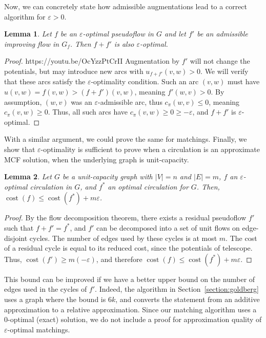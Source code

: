 \documentclass[11pt]{article}
\def\eps{\varepsilon}
\theoremstyle{plain}
\newtheorem{lemma}{Lemma}
\def\cost{\operatorname{cost}}
\begin{document}
Now, we can concretely state how admissible augmentations lead to a correct 
algorithm for $\eps > 0$.
\begin{lemma}
	Let $f$ be an $\eps$-optimal pseudoflow in $G$ and let $f'$ be an 
	admissible improving flow in $G_f$.
	Then $f + f'$ is also $\eps$-optimal.
\end{lemma}
\begin{proof}https://youtu.be/OcYzzPtCrII
	Augmentation by $f'$ will not change the potentials, but may introduce
	new arcs with $u_{f+f'}(v, w) > 0$.
	We will verify that these arcs satisfy the $\eps$-optimality condition.
	Such an arc $(v, w)$ must have $u(v, w) = f(v, w) > (f+f')(v, w)$, 
	meaning $f'(w, v) > 0$.
	By assumption, $(w, v)$ was an $\eps$-admissible arc, thus
	$c_\pi(w, v) \leq 0$, meaning $c_\pi(v, w) \geq 0$.
	Thus, all such arcs have $c_\pi(v, w) \geq 0 \geq -\eps$, and $f + f'$
	is $\eps$-optimal.
\end{proof}

With a similar argument, we could prove the same for matchings.
Finally, we show that $\eps$-optimality is sufficient to prove when a 
circulation is an approximate MCF solution, when the underlying graph is 
unit-capacity.

\begin{lemma}
\label{lemma:mcf_cost}
	Let $G$ be a unit-capacity graph with $|V| = n$ and $|E| = m$,
	$f$ an $\eps$-optimal circulation in $G$, and $f^*$ an optimal 
	circulation for $G$.
	Then, $\cost(f) \leq \cost(f^*) + m\eps$.
\end{lemma}
\begin{proof}
	By the flow decomposition theorem, there exists a residual pseudoflow 
	$f'$ such that $f + f' = f^*$, and $f'$ can be decomposed into a set of 
	unit flows on edge-disjoint cycles.
	The number of edges used by these cycles is at most $m$.
	The cost of a residual cycle is equal to its reduced cost, since the 
	potentials of telescope.
	Thus, $\cost(f') \geq m(-\eps)$, and therefore 
	$\cost(f) \leq \cost(f^*) + m\eps$.
\end{proof}

This bound can be improved if we have a better upper bound on the number of 
edges used in the cycles of $f'$.
Indeed, the algorithm in Section~\ref{section:goldberg} uses a graph where the
bound is $6k$, and converts the statement from an additive approximation to a 
relative approximation.
Since our matching algorithm uses a 0-optimal (exact) solution, we do not 
include a proof for approximation quality of $\eps$-optimal matchings.
\end{document}

